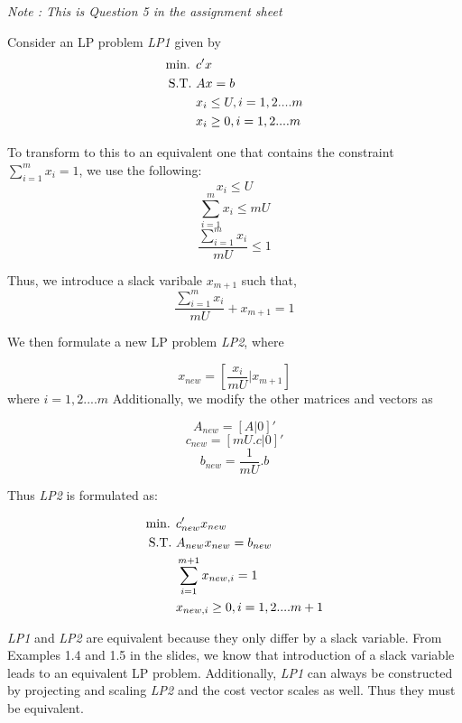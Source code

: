 \textit{Note : This is Question 5 in the assignment sheet}

Consider an LP problem \textit{LP1} given by
\begin{align}
    \text{min. } &c'x \notag\\
    \text{S.T. } &Ax = b \notag\\
    &x_i \le U, i = 1,2....m \notag\\
    &x_i \ge 0, i = 1,2....m \notag\\
\end{align}

To transform to this to an equivalent one that contains the constraint $\sum_{i=1}^{m}x_i = 1$, we use the following: 
\[ x_i \le U\]
\[ \sum_{i=1}^{m}x_i \le mU \]
\[ \frac{\sum_{i=1}^{m}x_i}{mU} \le 1\]

Thus, we introduce a slack varibale $x_{m+1}$ such that, 
\[ \frac{\sum_{i=1}^{m}x_i}{mU} + x_{m+1} = 1\]

We then formulate a new LP problem \textit{LP2}, where

\[ x_{new} = [\frac{x_i}{mU} | x_{m+1}]\]
where $i=1,2....m$
Additionally, we modify the other matrices and vectors as 

\[ A_{new} = [A | 0]'\]
\[ c_{new} = [mU.c | 0]'\]
\[ b_{new} = \frac{1}{mU}.b\]

Thus \textit{LP2} is formulated as:


\begin{align}
    \text{min. } &c_{new}'x_{new} \notag\\
    \text{S.T. } &A_{new}x_{new} = b_{new} \notag\\
    &\sum_{i=1}^{m+1}x_{new,i} = 1 \notag \\
    &x_{new,i} \ge 0, i = 1,2....m+1 \notag\\
\end{align}

\textit{LP1} and \textit{LP2} are equivalent because they only differ by a slack variable. From Examples 1.4 and 1.5 in the slides, we know that introduction of a slack variable leads to an equivalent LP problem. Additionally, \textit{LP1} can always be constructed by projecting and scaling \textit{LP2} and the cost vector scales as well. Thus they must be equivalent.